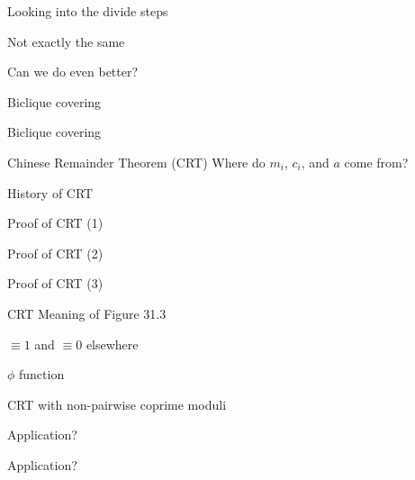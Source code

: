 \begin{frame}{Looking into the divide steps}
\end{frame}
\begin{frame}{Not exactly the same}
\end{frame}
\begin{frame}{Can we do even better?}
\end{frame}
\begin{frame}{Biclique covering}
\end{frame}
\begin{frame}{Biclique covering}
\end{frame}
\begin{frame}{Chinese Remainder Theorem (CRT)}
  Where do $m_i$, $c_i$, and $a$ come from?
\end{frame}
\begin{frame}{History of CRT}
\end{frame}
\begin{frame}{Proof of CRT (1)}
\end{frame}
\begin{frame}{Proof of CRT (2)}
\end{frame}
\begin{frame}{Proof of CRT (3)}
\end{frame}
\begin{frame}{CRT}
  Meaning of Figure 31.3

  $\equiv 1$ and $\equiv 0$ elsewhere
\end{frame}
\begin{frame}{$\phi$ function}
\end{frame}
\begin{frame}{CRT with non-pairwise coprime moduli}
\end{frame}
\begin{frame}{}
\end{frame}
\begin{frame}{Application?}
\end{frame}
\begin{frame}{Application?}
\end{frame}
